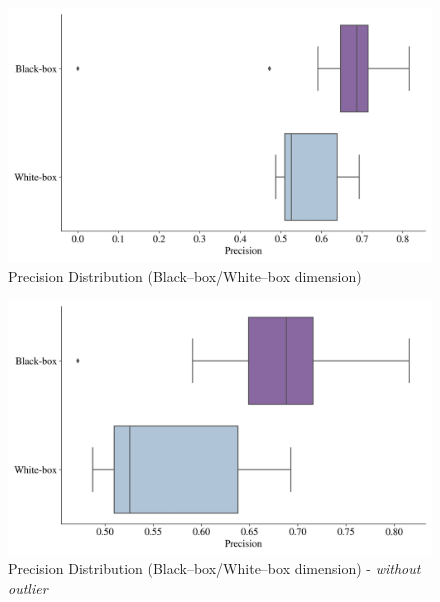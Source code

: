 \begin{figure}[H]
    \centering
    \caption{Precision Distribution (Black--box/White--box dimension)}\vspace{0.5em}
    \label{fig:precdistbbwb}
    \includegraphics[width=140mm]{Figures/PRECISION_Distribution_BB_WB.jpg}
    
    \vspace{-1em}
\end{figure}

\begin{figure}[H]
    \centering
    \caption{Precision Distribution (Black--box/White--box dimension) - \textit{without outlier}}\vspace{0.5em}
    \label{fig:precdistwooutbbwb}
    \includegraphics[width=140mm]{Figures/PRECISION_WO_OUTLIERS_Distribution_BB_WB.jpg}
    
    \vspace{-1em}
\end{figure}



